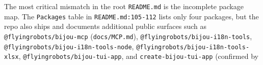 The most critical mismatch in the root \texttt{R\allowbreak{}E\allowbreak{}A\allowbreak{}D\allowbreak{}M\allowbreak{}E\allowbreak{}.\allowbreak{}m\allowbreak{}d} is the incomplete package map. The \texttt{P\allowbreak{}a\allowbreak{}c\allowbreak{}k\allowbreak{}a\allowbreak{}g\allowbreak{}e\allowbreak{}s} table in \texttt{R\allowbreak{}E\allowbreak{}A\allowbreak{}D\allowbreak{}M\allowbreak{}E\allowbreak{}.\allowbreak{}m\allowbreak{}d\allowbreak{}:\allowbreak{}1\allowbreak{}0\allowbreak{}5\allowbreak{}-\allowbreak{}1\allowbreak{}1\allowbreak{}2} lists only four packages, but the repo also ships and documents additional public surfaces such as \texttt{@\allowbreak{}f\allowbreak{}l\allowbreak{}y\allowbreak{}i\allowbreak{}n\allowbreak{}g\allowbreak{}r\allowbreak{}o\allowbreak{}b\allowbreak{}o\allowbreak{}t\allowbreak{}s\allowbreak{}/\allowbreak{}b\allowbreak{}i\allowbreak{}j\allowbreak{}o\allowbreak{}u\allowbreak{}-\allowbreak{}m\allowbreak{}c\allowbreak{}p} (\texttt{d\allowbreak{}o\allowbreak{}c\allowbreak{}s\allowbreak{}/\allowbreak{}M\allowbreak{}C\allowbreak{}P\allowbreak{}.\allowbreak{}m\allowbreak{}d}), \texttt{@\allowbreak{}f\allowbreak{}l\allowbreak{}y\allowbreak{}i\allowbreak{}n\allowbreak{}g\allowbreak{}r\allowbreak{}o\allowbreak{}b\allowbreak{}o\allowbreak{}t\allowbreak{}s\allowbreak{}/\allowbreak{}b\allowbreak{}i\allowbreak{}j\allowbreak{}o\allowbreak{}u\allowbreak{}-\allowbreak{}i\allowbreak{}1\allowbreak{}8\allowbreak{}n\allowbreak{}-\allowbreak{}t\allowbreak{}o\allowbreak{}o\allowbreak{}l\allowbreak{}s}, \texttt{@\allowbreak{}f\allowbreak{}l\allowbreak{}y\allowbreak{}i\allowbreak{}n\allowbreak{}g\allowbreak{}r\allowbreak{}o\allowbreak{}b\allowbreak{}o\allowbreak{}t\allowbreak{}s\allowbreak{}/\allowbreak{}b\allowbreak{}i\allowbreak{}j\allowbreak{}o\allowbreak{}u\allowbreak{}-\allowbreak{}i\allowbreak{}1\allowbreak{}8\allowbreak{}n\allowbreak{}-\allowbreak{}t\allowbreak{}o\allowbreak{}o\allowbreak{}l\allowbreak{}s\allowbreak{}-\allowbreak{}n\allowbreak{}o\allowbreak{}d\allowbreak{}e}, \texttt{@\allowbreak{}f\allowbreak{}l\allowbreak{}y\allowbreak{}i\allowbreak{}n\allowbreak{}g\allowbreak{}r\allowbreak{}o\allowbreak{}b\allowbreak{}o\allowbreak{}t\allowbreak{}s\allowbreak{}/\allowbreak{}b\allowbreak{}i\allowbreak{}j\allowbreak{}o\allowbreak{}u\allowbreak{}-\allowbreak{}i\allowbreak{}1\allowbreak{}8\allowbreak{}n\allowbreak{}-\allowbreak{}t\allowbreak{}o\allowbreak{}o\allowbreak{}l\allowbreak{}s\allowbreak{}-\allowbreak{}x\allowbreak{}l\allowbreak{}s\allowbreak{}x}, \texttt{@\allowbreak{}f\allowbreak{}l\allowbreak{}y\allowbreak{}i\allowbreak{}n\allowbreak{}g\allowbreak{}r\allowbreak{}o\allowbreak{}b\allowbreak{}o\allowbreak{}t\allowbreak{}s\allowbreak{}/\allowbreak{}b\allowbreak{}i\allowbreak{}j\allowbreak{}o\allowbreak{}u\allowbreak{}-\allowbreak{}t\allowbreak{}u\allowbreak{}i\allowbreak{}-\allowbreak{}a\allowbreak{}p\allowbreak{}p}, and \texttt{c\allowbreak{}r\allowbreak{}e\allowbreak{}a\allowbreak{}t\allowbreak{}e\allowbreak{}-\allowbreak{}b\allowbreak{}i\allowbreak{}j\allowbreak{}o\allowbreak{}u\allowbreak{}-\allowbreak{}t\allowbreak{}u\allowbreak{}i\allowbreak{}-\allowbreak{}a\allowbreak{}p\allowbreak{}p} (confirmed by 